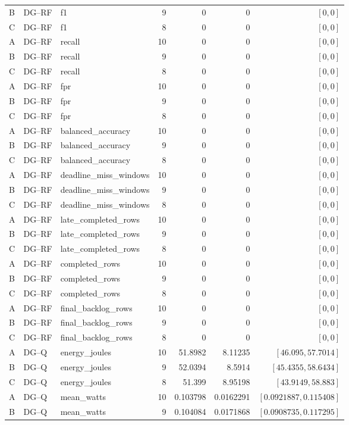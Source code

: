 \begin{longtable}{lllrrrr}
B & DG--RF & f1 & 9 & 0 & 0 & $[0,0]$\\
C & DG--RF & f1 & 8 & 0 & 0 & $[0,0]$\\
A & DG--RF & recall & 10 & 0 & 0 & $[0,0]$\\
B & DG--RF & recall & 9 & 0 & 0 & $[0,0]$\\
C & DG--RF & recall & 8 & 0 & 0 & $[0,0]$\\
A & DG--RF & fpr & 10 & 0 & 0 & $[0,0]$\\
B & DG--RF & fpr & 9 & 0 & 0 & $[0,0]$\\
C & DG--RF & fpr & 8 & 0 & 0 & $[0,0]$\\
A & DG--RF & balanced\_accuracy & 10 & 0 & 0 & $[0,0]$\\
B & DG--RF & balanced\_accuracy & 9 & 0 & 0 & $[0,0]$\\
C & DG--RF & balanced\_accuracy & 8 & 0 & 0 & $[0,0]$\\
A & DG--RF & deadline\_miss\_windows & 10 & 0 & 0 & $[0,0]$\\
B & DG--RF & deadline\_miss\_windows & 9 & 0 & 0 & $[0,0]$\\
C & DG--RF & deadline\_miss\_windows & 8 & 0 & 0 & $[0,0]$\\
A & DG--RF & late\_completed\_rows & 10 & 0 & 0 & $[0,0]$\\
B & DG--RF & late\_completed\_rows & 9 & 0 & 0 & $[0,0]$\\
C & DG--RF & late\_completed\_rows & 8 & 0 & 0 & $[0,0]$\\
A & DG--RF & completed\_rows & 10 & 0 & 0 & $[0,0]$\\
B & DG--RF & completed\_rows & 9 & 0 & 0 & $[0,0]$\\
C & DG--RF & completed\_rows & 8 & 0 & 0 & $[0,0]$\\
A & DG--RF & final\_backlog\_rows & 10 & 0 & 0 & $[0,0]$\\
B & DG--RF & final\_backlog\_rows & 9 & 0 & 0 & $[0,0]$\\
C & DG--RF & final\_backlog\_rows & 8 & 0 & 0 & $[0,0]$\\
A & DG--Q & energy\_joules & 10 & 51.8982 & 8.11235 & $[46.095,57.7014]$\\
B & DG--Q & energy\_joules & 9 & 52.0394 & 8.5914 & $[45.4355,58.6434]$\\
C & DG--Q & energy\_joules & 8 & 51.399 & 8.95198 & $[43.9149,58.883]$\\
A & DG--Q & mean\_watts & 10 & 0.103798 & 0.0162291 & $[0.0921887,0.115408]$\\
B & DG--Q & mean\_watts & 9 & 0.104084 & 0.0171868 & $[0.0908735,0.117295]$\\

\end{longtable}
